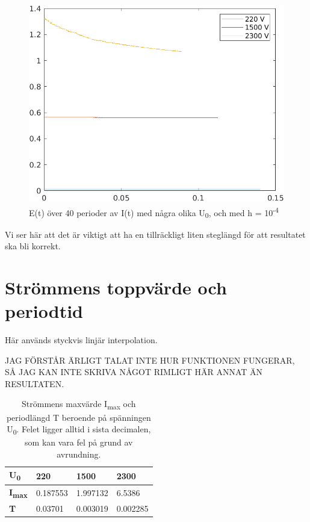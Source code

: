 \documentclass[a4paper, titlepage, 11pt]{article}
\begin{document}
\begin{figure}[H]
  \includegraphics[width=\linewidth]{E-bigH.png}
  \caption{E(t) över 40 perioder av I(t) med några olika U\textsubscript{0}, och med h = 10\textsuperscript{-4}}
\end{figure}

Vi ser här att det är viktigt att ha en tillräckligt liten steglängd för att resultatet ska bli korrekt.


\section{Strömmens toppvärde och periodtid}
Här används styckvis linjär interpolation.

JAG FÖRSTÅR ÄRLIGT TALAT INTE HUR FUNKTIONEN FUNGERAR, SÅ JAG KAN INTE SKRIVA NÅGOT RIMLIGT HÄR ANNAT ÄN RESULTATEN.

\begin{table}[H]
\caption{Strömmens maxvärde I\textsubscript{max} och periodlängd T beroende på spänningen U\textsubscript{0}. Felet ligger alltid i sista decimalen, som kan vara fel på grund av avrundning.}
\begin{center}
\begin{tabular}{l|lll}
\hline
\textbf{U\textsubscript{0}}   & 220    & 1500   & 2300   \\ \hline
\textbf{I\textsubscript{max}} & 0.187553 & 1.997132 & 6.5386 \\
\textbf{T}    & 0.03701  & 0.003019 & 0.002285
\end{tabular}
\end{center}
\end{table}
\end{document}
